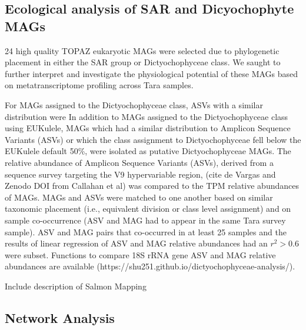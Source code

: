 \documentclass[12pt]{article}
\numberwithin{equation}{section}
\begin{document}
\subsection*{Ecological analysis of SAR and Dicyochophyte MAGs}
24 high quality TOPAZ eukaryotic MAGs were selected due to phylogenetic placement in either the SAR group or Dictyochophyceae class. We saught to further interpret and investigate the physiological potential of these MAGs based on metatranscriptome profiling across Tara samples. 

For MAGs assigned to the Dictyochophyceae class, ASVs with a similar distribution were In addition to MAGs assigned to the Dictyochophyceae class using EUKulele, MAGs which had a similar distribution to Amplicon Sequence Variants (ASVs) or which the class assignment to Dictyochophyceae fell below the EUKulele default 50\%, were isolated as putative Dictyochophyceae MAGs. The relative abundance of Amplicon Sequence Variants (ASVs), derived from a sequence survey targeting the V9 hypervariable region, (cite de Vargas and Zenodo DOI from Callahan et al) was compared to the TPM relative abundances of MAGs. MAGs and ASVs were matched to one another based on similar taxonomic placement (i.e., equivalent division or class level assignment) and on sample co-occurrence (ASV and MAG had to appear in the same Tara survey sample). ASV and MAG pairs that co-occurred in at least 25 samples and the results of linear regression of ASV and MAG relative abundances had an $r^2 > 0.6$ were subset. Functions to compare 18S rRNA gene ASV and MAG relative abundances are available (https://shu251.github.io/dictyochophyceae-analysis/). %

Include description of Salmon Mapping

\subsection*{Network Analysis} 
\end{document}
